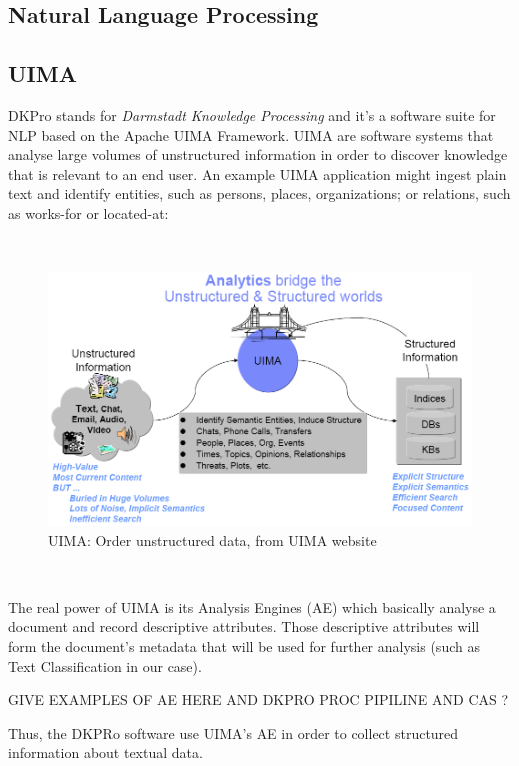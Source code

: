 \subsection{Natural Language Processing}
\subsection{UIMA}
DKPro stands for \emph{Darmstadt Knowledge Processing}
\cite{GurevychEtal2007dkpro0} and it's a software suite for NLP based on the Apache UIMA Framework. UIMA are software systems that analyse large volumes of unstructured information in order to discover knowledge that is relevant to an end user. An example UIMA application might ingest plain text and identify entities, such as persons, places, organizations; or relations, such as works-for or located-at:

\
\begin{figure}[ht]
    \centering
    \includegraphics[width=1\textwidth]{fig/uima.png}
    \caption[Short caption]{UIMA: Order unstructured data, from UIMA website \cite{uima:Online}}
    \label{fig:uima}
\end{figure}
\

The real power of UIMA is its Analysis Engines (AE) which basically analyse a document and record descriptive attributes. Those descriptive attributes will form the document's metadata that will be used for further analysis (such as Text Classification in our case).

GIVE EXAMPLES OF AE HERE AND DKPRO PROC PIPILINE AND CAS ?

Thus, the DKPRo software use UIMA's AE in order to collect structured information about textual data. 
